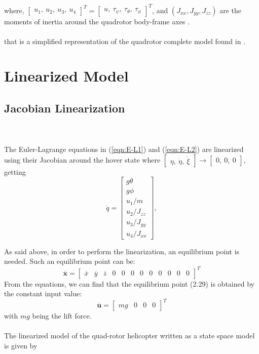 where, $\begin{bmatrix}
u_{1},\ u_{2},\ u_{3}, \ u_{4}
\end{bmatrix}^{T} = \begin{bmatrix}
u,\ \tau_{\psi},\ \tau_{\theta},\ \tau_{\phi}
\end{bmatrix}^{T} $, and $ (J_{xx}, J_{yy}, J_{zz}) $ are the moments of inertia around the quadrotor body-frame axes \cite{Emam2016, Badr2016}.
\\\\

that is a simplified representation of the quadrotor complete model found in \cite{Bouabdallah2007}.

\section{Linearized Model}
\label{sec:linearized}
\setcounter{MaxMatrixCols}{20}
\subsection{Jacobian Linearization}
\cite{Sabatino2015}
\\\\
The Euler-Lagrange equations in (\ref{eqn:E-L1}) and (\ref{eqn:E-L2}) are linearized using their Jacobian around the hover state where $\begin{bmatrix}
\eta,\ \dot{\eta},\ \dot{\xi}
\end{bmatrix} \to \begin{bmatrix}
0,\ 0,\ 0
\end{bmatrix}$, getting
\begin{equation}
\label{eqn:linear}
\ddot{q}
=
\begin{bmatrix}
g\theta \\
g\phi\\
u_{1}/m \\
u_{2}/J_{zz} \\
u_{3}/J_{yy} \\
u_{4}/J_{xx}
\end{bmatrix},
\end{equation}

As said above, in order to perform the linearization, an equilibrium point is
needed. Such an equilibrium point can be:
\begin{equation}
\overline{\mathbf{x}} = \begin{bmatrix}
\overline{x} & \overline{y} & \overline{z} & 0 & 0 & 0 & 0 & 0 & 0 & 0 & 0 & 0
\end{bmatrix}^{T}
\end{equation}
From the equations, we can find that the equilibrium point (2.29) is obtained by
the constant input value:
\begin{equation}
\overline{\mathbf{u}} = \begin{bmatrix}
mg & 0 & 0 & 0
\end{bmatrix}^{T}
\end{equation}
with $mg$ being the lift force.
\\\\
The linearized model of the quad-rotor helicopter written as a state space model is given by

